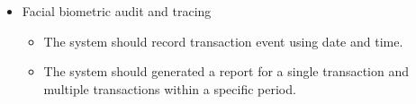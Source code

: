 \documentclass{article}
\begin{document}
\begin{itemize}
\begin{itemize}
        \begin{itemize}
            \item The system should inform the customer that the images have been captured and validation is underway.
            \item The system should re-direct the user to the home-page and an indicator show that an validation is ongoing.
            \item The system should inform the customer when the validation is complete via Email and SMS. 
            Depending on the outcome, the system should send a successful or failed authentication to internal systems. 
            \item The system should not allow a user reperform facial biometric with an hour from the last attempt. 
        \end{itemize}
    \end{itemize}
    \item Facial biometric audit and tracing 
    \begin{itemize}
        \item The system should record transaction event using date and time.
        \item The system should generated a report for a single transaction and multiple transactions within a specific period. 
    \end{itemize}
\end{itemize}
\end{document}
